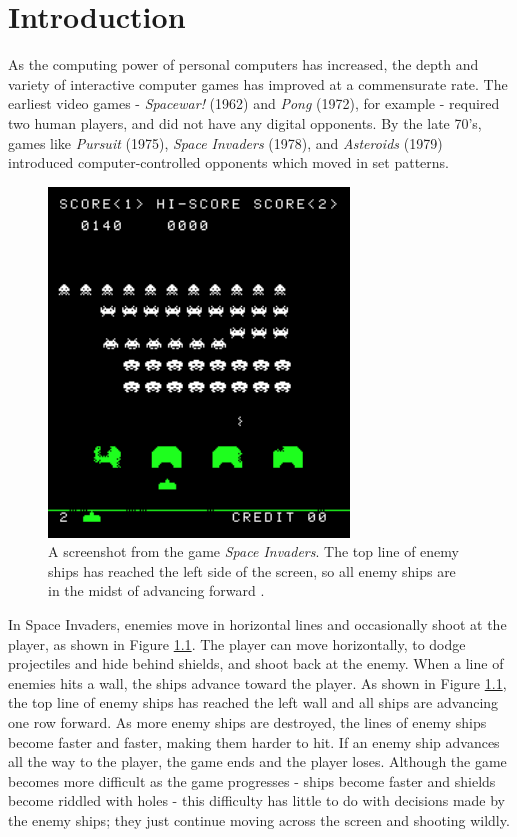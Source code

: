 \chapter{Introduction}
As the computing power of personal computers has increased, the depth and variety of interactive computer games has improved at a commensurate rate. The earliest video games - \textit{Spacewar!} (1962) and \textit{Pong} (1972), for example - required two human players, and did not have any digital opponents. By the late 70's, games like \textit{Pursuit} (1975), \textit{Space Invaders} (1978), and \textit{Asteroids} (1979) introduced computer-controlled opponents which moved in set patterns.\\

\begin{figure}[H]
  \centering
  \includegraphics[width=8cm]{figures/space-invaders.png}
  \caption{A screenshot from the game \textit{Space Invaders}. The top line of enemy ships has reached the left side of the screen, so all enemy ships are in the midst of advancing forward \cite{spaceinvaders78}.}
  \label{fig:SpaceInvaders}
\end{figure}

In Space Invaders, enemies move in horizontal lines and occasionally shoot at the player, as shown in Figure \ref{fig:SpaceInvaders}. The player can move horizontally, to dodge projectiles and hide behind shields, and shoot back at the enemy. When a line of enemies hits a wall, the ships advance toward the player. As shown in Figure \ref{fig:SpaceInvaders}, the top line of enemy ships has reached the left wall and all ships are advancing one row forward. As more enemy ships are destroyed, the lines of enemy ships become faster and faster, making them harder to hit. If an enemy ship advances all the way to the player, the game ends and the player loses. Although the game becomes more difficult as the game progresses - ships become faster and shields become riddled with holes - this difficulty has little to do with decisions made by the enemy ships; they just continue moving across the screen and shooting wildly.\\

